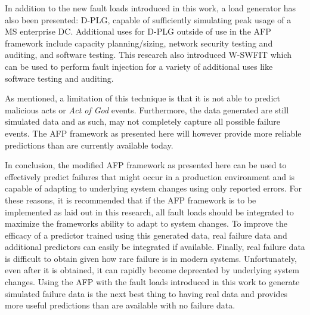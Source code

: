 In addition to the new fault loads introduced in this work, a load generator
has also been presented:  \ac{D-PLG}, capable of sufficiently simulating peak
usage of a \ac{MS} enterprise \ac{DC}.  Additional uses for \ac{D-PLG} outside
of use in the \ac{AFP} framework include capacity planning/sizing, network
security testing and auditing, and software testing.  This research also
introduced \ac{W-SWFIT} which can be used to perform fault injection for a
variety of additional uses like software testing and auditing.

As mentioned, a limitation of this technique is that it is not able to predict
malicious acts or \emph{Act of God} events.  Furthermore, the data generated
are still simulated data and as such, may not completely capture all possible
failure events.  The \ac{AFP} framework as presented here will however provide
more reliable predictions than are currently available today.

In conclusion, the modified \ac{AFP} framework as presented here can be used to
effectively predict failures that might occur in a production environment and
is capable of adapting to underlying system changes using only reported errors.
For these reasons, it is recommended that if the \ac{AFP} framework is to be
implemented as laid out in this research, all fault loads should be integrated
to maximize the frameworks ability to adapt to system changes.  To improve the
efficacy of a predictor trained using this generated data, real failure data
and additional predictors can easily be integrated if available.  Finally, real
failure data is difficult to obtain given how rare failure is in modern
systems.  Unfortunately, even after it is obtained, it can rapidly become
deprecated by underlying system changes.  Using the \ac{AFP} with the fault
loads introduced in this work to generate simulated failure data is the next
best thing to having real data and provides more useful predictions than are
available with no failure data.
